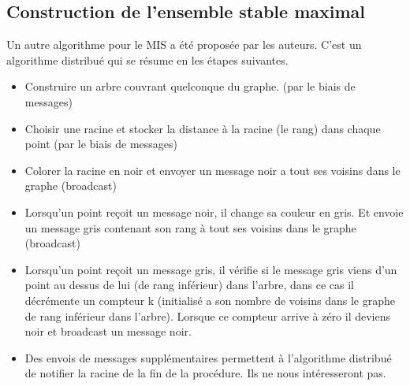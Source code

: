 \subsection{Construction de l'ensemble stable maximal}\label{mis}
Un autre algorithme pour le MIS a été proposée par les auteurs. C'est un algorithme distribué qui se résume en les étapes suivantes.
\begin{itemize}
\item Construire un arbre couvrant quelconque du graphe. (par le biais de messages)
\item Choisir une racine et stocker la distance à la racine (le rang) dans chaque point (par le biais de messages)
\item Colorer la racine en noir et envoyer un message noir a tout ses voisins dans le graphe (broadcast)
\item Lorsqu'un point reçoit un message noir, il change sa couleur en gris. Et envoie un message gris contenant son rang à tout ses voisins dans le graphe (broadcast)
\item Lorsqu'un point reçoit un message gris, il vérifie si le message gris viens d'un point au dessus de lui (de rang inférieur) dans l'arbre, dans ce cas il décrémente un compteur k (initialisé a son nombre de voisins dans le graphe de rang inférieur dans l'arbre). Lorsque ce compteur arrive à zéro il deviens noir et broadcast un message noir.
\item Des envois de messages supplémentaires permettent à l'algorithme distribué de notifier la racine de la fin de la procédure. Ils ne nous intéresseront pas.
\end{itemize}

